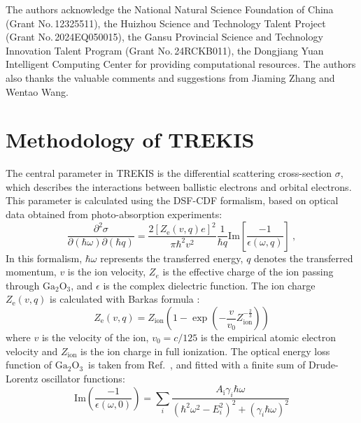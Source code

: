 \documentclass[%
reprint,
superscriptaddress,
 amsmath,amssymb,
 aps,
]{revtex4-2}
\newcommand{\ga}{$\text{Ga}_2\text{O}_3$}
\begin{document}
\begin{acknowledgments}
The authors acknowledge the National Natural Science Foundation of China (Grant 
No.\,12325511), the Huizhou Science and Technology Talent Project (Grant 
No.\,2024EQ050015), the Gansu Provincial Science and Technology Innovation 
Talent Program (Grant No.\,24RCKB011), the Dongjiang Yuan Intelligent Computing 
Center for providing computational resources. 
The authors also thanks the valuable comments and suggestions 
from Jiaming Zhang and Wentao Wang. 
\end{acknowledgments}

\appendix

\section{Methodology of TREKIS}
\label{app:trekis}
The central parameter in TREKIS is the differential scattering cross-section 
$\sigma$, which describes the interactions between ballistic electrons and 
orbital electrons. 
This parameter is calculated using the DSF-CDF formalism, based 
on optical data obtained from photo-absorption experiments: 
\begin{equation} 
\frac{\partial^{2}\sigma}{\partial(\hbar\omega)\partial(\hbar q)} = 
\frac{2[Z_{\text{e}}(v,q)e]^{2}}{\pi\hbar^{2}v^{2}} \frac{1}{\hbar 
q}\mathrm{Im}[\frac{-1}{\epsilon(\omega,q)}]\ , \label{eq1} 
\end{equation} 
In this formalism, $\hbar\omega$ represents the transferred energy, $q$ denotes 
the transferred momentum, $v$ is the ion velocity, $Z_e$ is the effective 
charge of the ion passing through \ga, and $\epsilon$ is the complex 
dielectric function. 
The ion charge $Z_{\text{e}}(v,q)$ is calculated with Barkas formula 
\cite{Gervais1994}: 
\begin{equation} 
Z_{\text{e}}(v,q) = Z_{\text{ion}}(1-\exp(-\frac{v}{v_{0}}Z_{\text{ion}}^{-\frac{2}{3}})) 
\end{equation} 
where $v$ is the velocity of the ion, $v_{0}=c/125$ is the empirical atomic 
electron velocity and $Z_{\text{ion}}$ is the ion charge in full ionization. 
The optical energy loss function of \ga\ is taken from 
Ref.~\cite{he_first-principles_2006}, and fitted with a finite sum of Drude-Lorentz 
oscillator functions: 
\begin{equation} 
\mathrm{Im}(\frac{-1}{\epsilon(\omega,0)}) = \sum_{i} 
\frac{A_{\mathrm{i}}\gamma_{i}\hbar\omega}{(\hbar^{2}\omega^{2}-E_{i}^{2})^{2}+(\gamma_{i}\hbar\omega)^{2}} 
\end{equation} 
\end{document}
